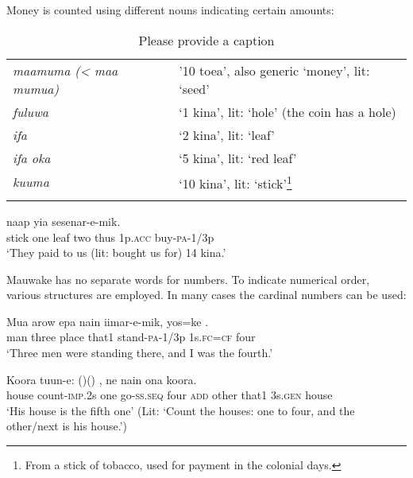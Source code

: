 Money is counted using different nouns indicating certain amounts:

\begin{table}
\caption{Please provide a caption}
 
\begin{tabular}{>{\itshape}ll}
\mytoprule
maamuma ({\textless} maa mumua) &'10 toea', also generic `money', lit: `seed'\\
fuluwa &`1 kina', lit: `hole' (the coin has a hole)\\
ifa &`2 kina', lit: `leaf'\\
ifa oka &`5 kina', lit: `red leaf'\\
kuuma &`10 kina', lit: `stick'\footnote{From a stick of tobacco, used for payment in the colonial days.} \\
\mybottomrule
\end{tabular}
\end{table}


\ea%
\label{ex:3:x97}
\gll {}    naap yia sesenar-e-mik. \\
stick one leaf two thus 1p.\textsc{acc} buy-\textsc{pa}-1/3p\\
\glt`They paid to us (lit: bought us for) 14 kina.' 
\z

Mauwake has no separate words for  numbers. To indicate numerical order, various structures are employed. In many cases the cardinal numbers can be used:

\ea%
\label{ex:3:x96}
\gll Mua arow epa nain iimar-e-mik, yos=ke . \\
man three place that1 stand-\textsc{pa}-1/3p 1s.\textsc{fc}=\textsc{cf} four\\
\glt`Three men were standing there, and I was the fourth.'
\z

\ea%
\label{ex:3:x428}
\gll Koora tuun-e:  ()\textstyleEmphasizedVernacularWords{-}() , ne   nain ona koora.\\
house count-\textsc{imp}.2s one go-\textsc{ss}.\textsc{seq} four \textsc{add} other that1 3s.\textsc{gen} house\\
\glt`His house is the fifth one' (Lit: `Count the houses: one to four, and the other/next is his house.')
\z

